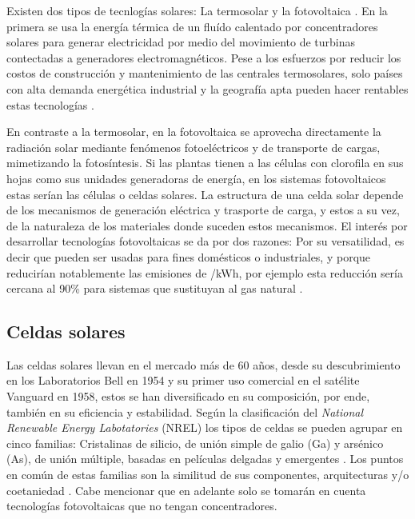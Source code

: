 Existen dos tipos de tecnlogías solares: La termosolar y la fotovoltaica \cite{hammarstrom2012}. En la primera se usa la energía térmica de un fluído calentado por concentradores solares para generar electricidad por medio del movimiento de turbinas contectadas a generadores electromagnéticos. Pese a los esfuerzos por reducir los costos de construcción y mantenimiento de las centrales termosolares, solo países con alta demanda energética industrial y la geografía apta pueden hacer rentables estas tecnologías \cite{xu2022concentrated}.


En contraste a la termosolar, en la fotovoltaica se aprovecha directamente la radiación solar mediante fenómenos fotoeléctricos y de transporte de cargas, mimetizando la fotosíntesis. Si las plantas tienen a las células con clorofila en sus hojas como sus unidades generadoras de energía, en los sistemas fotovoltaicos estas serían las células o celdas solares. La estructura de una celda solar depende de los mecanismos de generación eléctrica y trasporte de carga, y estos a su vez, de la naturaleza de los materiales donde suceden estos mecanismos. El interés por desarrollar tecnologías fotovoltaicas se da por dos razones: Por su versatilidad, es decir que pueden ser usadas para fines domésticos o industriales, y  porque reducirían notablemente las emisiones de /kWh, por ejemplo esta reducción sería cercana al 90\% para sistemas que sustituyan al gas natural \cite{tawalbeh2021environmental}.

 \subsection{Celdas solares}

Las celdas solares llevan en el mercado más de 60 años, desde su descubrimiento en los  Laboratorios Bell en 1954 \cite{green2009path} y su primer uso comercial en el satélite Vanguard \cite{singh2013solar} en 1958, estos se han diversificado en su composición, por ende, también en su eficiencia y estabilidad. Según la clasificación del \textit{National Renewable Energy Labotatories} (NREL) los tipos de celdas se pueden agrupar en cinco familias: Cristalinas de silicio, de unión simple de galio (Ga) y arsénico (As), de unión múltiple, basadas en películas delgadas y emergentes \cite{nrel}. Los puntos en común de estas familias son la similitud de sus componentes, arquitecturas y/o coetaniedad \cite{blakers2013}. Cabe mencionar que en adelante solo se tomarán en cuenta tecnologías fotovoltaicas que no tengan concentradores.


